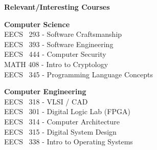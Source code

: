 \documentclass[letterpaper,11pt]{article}
\newcommand{\resheading}[1]{{\large \colorbox{shadingcolor}{\begin{minipage}{\textwidth}{\textbf{#1 \vphantom{p\^{E}}}}\end{minipage}}}}
\begin{document}
\vspace{0.1in}

%
%
\resheading{Relevant/Interesting Courses}

\vspace{0.1in}
\begin{minipage}{\linewidth}
\vfill\noindent
\begin{minipage}[b]{0.5\textwidth}
	\raggedright
	\textbf{Computer Science} \\
	EECS \ 293 - Software Craftsmanship \\
	EECS \ 393 - Software Engineering \\
	EECS \ 444 - Computer Security \\
	MATH 408 - Intro to Cryptology \\
	EECS \ 345 - Programming Language Concepts \\
\end{minipage}
\begin{minipage}[b]{0.5\textwidth}
	\raggedright
	\textbf{Computer Engineering} \\
	EECS \ 318 - VLSI / CAD \\
	EECS \ 301 - Digital Logic Lab (FPGA) \\
	EECS \ 314 - Computer Architecture \\
	EECS \ 315 - Digital System Design \\
	EECS \ 338 - Intro to Operating Systems \\
\end{minipage}

\end{minipage}
\end{document}
